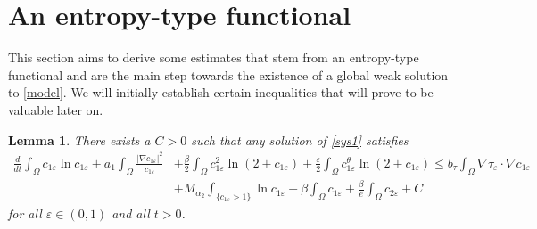 \documentclass[a4paper,10pt]{article}
\newtheorem{Lemma}[Theorem]{Lemma}
\theoremstyle{definition}
\begin{document}
\section{An entropy-type functional}\label{sec:entropy}
This section aims to derive some estimates that stem from an entropy-type functional and are the main step towards the existence of a global weak solution to \eqref{model}. We will initially establish certain inequalities that will prove to be valuable later on.
\begin{Lemma}
  \label{entropy1}
  There exists a $C > 0$ such that any solution of \eqref{sys1} satisfies
  \begin{align}
    \label{c1entro_ineq1}
    \nonumber \frac{d}{dt} \int_\Omega c_{1\varepsilon} \ln c_{1\varepsilon}  + a_1 \int_\Omega \frac{|\nabla c_{1\varepsilon}|^2}{c_{1\varepsilon}} & + \frac{\beta}{2} \int_\Omega c_{1\varepsilon}^2 \ln(2 + c_{1\varepsilon}) + \frac{\varepsilon}{2} \int_\Omega c_{1\varepsilon}^\theta \ln(2 + c_{1\varepsilon}) \leq b_\tau \int_\Omega  \nabla \tau_\varepsilon \cdot \nabla c_{1\varepsilon} \\[5pt]
    & +  M_{\alpha_2}\int_{\{ c_{1\varepsilon} > 1\}} \ln c_{1\varepsilon} + \beta \int_\Omega c_{1\varepsilon}  + \frac{\beta}{e} \int_\Omega c_{2\varepsilon}  + C
  \end{align}
  for all $\varepsilon \in (0, 1)$ and all $t > 0$.
 \end{Lemma}
\end{document}
